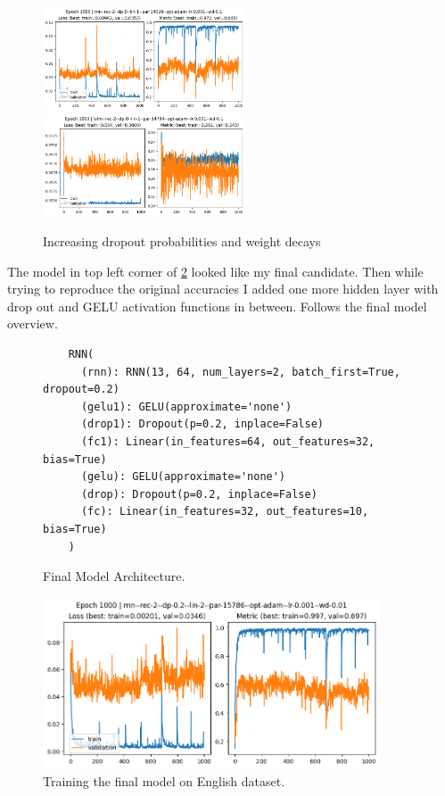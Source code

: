 \documentclass[a4paper,10pt]{article}
\begin{document}
\begin{figure}[H]
\begin{center}
            \includegraphics[width=6cm]{figures/rnn--rec-2--dp-0--lin-1--par-14026--opt-adam--lr-0.001--wd-0.1--e-1000.png}
            \includegraphics[width=6cm]{figures/lstm--rec-2--dp-0--lin-1--par-14794--opt-adam--lr-0.001--wd-0.1--e-1000.png}
      \end{center}
      \caption{Increasing dropout probabilities and weight decays}
      \label{fig8}
\end{figure}

The model in top left corner of \ref{fig8} looked like my final candidate.
Then while trying to reproduce the original accuracies I added one more hidden layer with drop out and GELU activation functions in between.
Follows the final model overview.

\begin{figure}[H]
    \begin{verbatim}
    RNN(
      (rnn): RNN(13, 64, num_layers=2, batch_first=True, dropout=0.2)
      (gelu1): GELU(approximate='none')
      (drop1): Dropout(p=0.2, inplace=False)
      (fc1): Linear(in_features=64, out_features=32, bias=True)
      (gelu): GELU(approximate='none')
      (drop): Dropout(p=0.2, inplace=False)
      (fc): Linear(in_features=32, out_features=10, bias=True)
    )
    \end{verbatim}
    \caption{Final Model Architecture.}
    \label{fig8}
\end{figure}

\begin{figure}[H]
      \begin{center}
            \includegraphics[width=10cm]{figures/final--rnn--rec-2--dp-0.2--lin-2--par-15786--opt-adam--lr-0.001--wd-0.01.png}
      \end{center}
      \caption{Training the final model on English dataset.}
      \label{fig9}
\end{figure}
\end{document}
